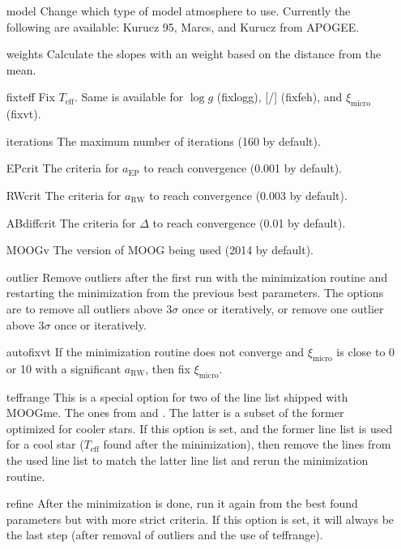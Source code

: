 \documentclass{aa}
\begin{document}
\begin{itemize}
    \item[model] Change which type of model atmosphere to use. Currently the
          following are available: Kurucz 95, Marcs, and Kurucz from APOGEE.
    \item[weights] Calculate the slopes with an weight based on the distance
          from the mean.
    \item[fixteff] Fix $T_\mathrm{eff}$. Same is available for $\log g$
          (fixlogg), [/] (fixfeh), and $\xi_\mathrm{micro}$
          (fixvt).
    \item[iterations] The maximum number of iterations (160 by default).
    \item[EPcrit] The criteria for $a_\mathrm{EP}$ to reach convergence (0.001
          by default).
    \item[RWcrit] The criteria for $a_\mathrm{RW}$ to reach convergence (0.003
          by default).
    \item[ABdiffcrit] The criteria for $\Delta$ to reach convergence
          (0.01 by default).
    \item[MOOGv] The version of MOOG being used (2014 by default).
    \item[outlier] Remove outliers after the first run with the minimization
          routine and restarting the minimization from the previous best
          parameters. The options are to remove all outliers above $3\sigma$
          once or iteratively, or remove one outlier above $3\sigma$ once or
          iteratively.
    \item[autofixvt] If the minimization routine does not converge and
          $\xi_\mathrm{micro}$ is close to 0 or 10 with a significant
          $a_\mathrm{RW}$, then fix $\xi_\mathrm{micro}$.
    \item[teffrange] This is a special option for two of the line list shipped
          with MOOGme. The ones from \citet{Sousa2015b} and \citet{Tsantaki2013}.
          The latter is a subset of the former optimized for cooler stars.
          If this option is set, and the former line list is used for a cool
          star ($T_\mathrm{eff}$ found after the minimization), then remove
          the lines from the used line list to match the latter line list and
          rerun the minimization routine.
    \item[refine] After the minimization is done, run it again from the best
          found parameters but with more strict criteria. If this option is set,
          it will always be the last step (after removal of outliers and the
          use of teffrange).
\end{itemize}
\end{document}
